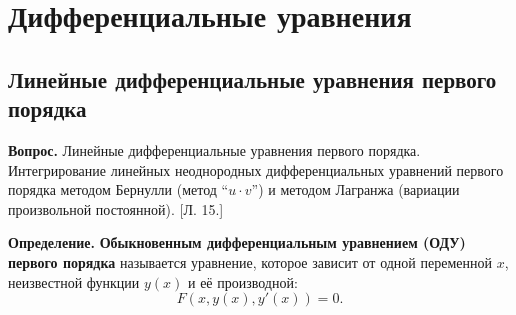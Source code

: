 \documentclass[a4paper,11pt]{article}
\newcommand{\examquestion}[1]{
\begin{questionbox}
\textbf{Вопрос.} #1
\end{questionbox}
}
\newcommand{\examdefinition}[1]{
\begin{definitionbox}
\textbf{Определение.} #1
\end{definitionbox}
}
\newcommand{\term}[1]{\textbf{#1}}
\begin{document}
\tableofcontents
\newpage


\section{Дифференциальные уравнения}

\subsection{Линейные дифференциальные уравнения первого порядка}

\examquestion{Линейные дифференциальные уравнения первого порядка. Интегрирование линейных неоднородных дифференциальных уравнений первого порядка методом Бернулли (метод ``$u \cdot v$'') и методом Лагранжа (вариации произвольной постоянной). [Л. 15.]}

\examdefinition{
\term{Обыкновенным дифференциальным уравнением (ОДУ) первого порядка} называется уравнение, которое зависит от одной переменной $x$, неизвестной функции $y(x)$ и её производной:
\[
F(x,y(x),y'(x))=0.
\]
}
\end{document}
